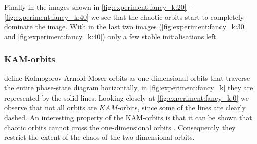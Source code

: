  Finally in the images shown in \cref{fig:experiment:fancy_k:20} - \ref{fig:experiment:fancy_k:40} we see that the chaotic orbits start to completely dominate the image. With in the last two images (\cref{fig:experiment:fancy_k:30} and \ref{fig:experiment:fancy_k:40}) only a few stable initialisations left. 

\subsubsection{KAM-orbits}
\label{ss:b:kam}
\citeauthor{kenzel1997physics} define Kolmogorov-Arnold-Moser-orbits as one-dimensional orbits that traverse the entire phase-state diagram horizontally, in \cref{fig:experiment:fancy_k} they are represented by the solid lines. Looking closely at \cref{fig:experiment:fancy_k:0} we observe that not all orbits are $KAM$-orbits, since some of the lines are clearly dashed. An interesting property of the KAM-orbits is that it can be shown that chaotic orbits cannot cross the one-dimensional orbits \cite{kenzel1997physics}. Consequently they restrict the extent of the chaos of the two-dimensional orbits.\\

